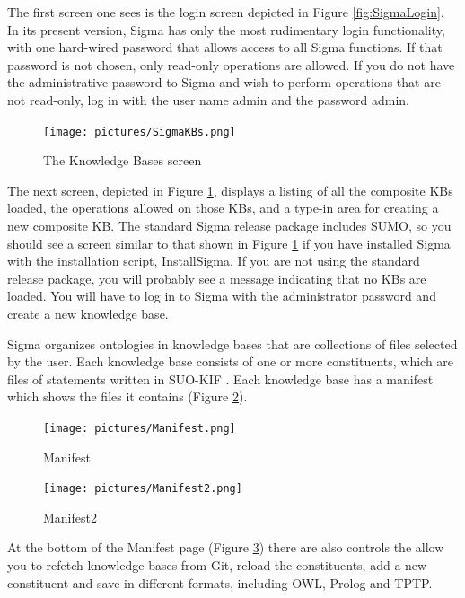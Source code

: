 \documentclass{book}
\begin{document}
The first screen one sees is the login screen depicted in Figure
\ref{fig:SigmaLogin}.  In its present version, Sigma has only the most
rudimentary login functionality, with one hard-wired password that allows access
to all Sigma functions.  If that password is not chosen, only read-only
operations are allowed.  If you do not have the administrative password to Sigma
and wish to perform operations that are not read-only, log in with the user name
admin and the password admin.

\begin{figure}
  \centering
  \texttt{[image: pictures/SigmaKBs.png]}
  \caption{The Knowledge Bases screen}
  \label{fig:SigmaKBs}
\end{figure}

The next screen, depicted in Figure \ref{fig:SigmaKBs}, displays a listing of
all the composite KBs loaded, the operations allowed on those KBs, and a type-in
area for creating a new composite KB.  The standard Sigma release package
includes SUMO, so you should see a screen similar to that shown in Figure
\ref{fig:SigmaKBs} if you have installed Sigma with the installation script,
InstallSigma.  If you are not using the standard release
package, you will probably see a message indicating that no KBs are loaded.  You
will have to log in to Sigma with the administrator password and create a new
knowledge base.

Sigma organizes ontologies in knowledge bases that are collections of files
selected by the user.  Each knowledge base consists of one or more constituents,
which are files of statements written in SUO-KIF \cite{Pease2009}.  Each
knowledge base has a manifest which shows the files it contains (Figure
\ref{fig:Manifest}).

\begin{figure}
  \centering
  \texttt{[image: pictures/Manifest.png]}
  \caption{Manifest}
  \label{fig:Manifest}
\end{figure}

\begin{figure}
  \centering
  \texttt{[image: pictures/Manifest2.png]}
  \caption{Manifest2}
  \label{fig:Manifest2}
\end{figure}

At the bottom of the Manifest page (Figure
\ref{fig:Manifest2}) there are also controls the allow you to
refetch knowledge bases from Git, reload the constituents, add a new
constituent and save in different formats, including OWL, Prolog and TPTP.
\end{document}
